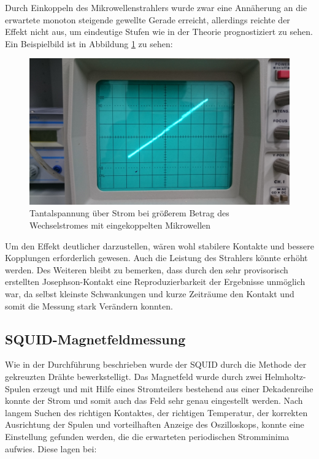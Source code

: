		Durch Einkoppeln des Mikrowellenstrahlers wurde zwar eine Annäherung an die erwartete monoton steigende gewellte Gerade erreicht, allerdings reichte der Effekt nicht aus, um eindeutige Stufen wie in der Theorie prognostiziert zu sehen. 
		Ein Beispielbild ist in Abbildung \ref{nichtwelle} zu sehen:
		\begin{figure}
			\center
			\includegraphics[scale=0.08]{messwerte/DSC_0622.JPG}
			\caption{Tantalspannung über Strom bei größerem Betrag des Wechselstromes mit eingekoppelten Mikrowellen}
			\label{nichtwelle}
		\end{figure}
		Um den Effekt deutlicher darzustellen, wären wohl stabilere Kontakte und bessere Kopplungen erforderlich gewesen. 
		Auch die Leistung des Strahlers könnte erhöht werden.
		Des Weiteren bleibt zu bemerken, dass durch den sehr provisorisch erstellten Josephson-Kontakt eine Reproduzierbarkeit der Ergebnisse unmöglich war, da selbst kleinste Schwankungen und kurze Zeiträume den Kontakt und somit die Messung stark Verändern konnten.



	\subsection{SQUID-Magnetfeldmessung} %
	\label{sub:squid_magnetfeldmessung}
	
		Wie in der Durchführung beschrieben wurde der SQUID durch die Methode der gekreuzten Drähte bewerkstelligt. 
		Das Magnetfeld wurde durch zwei Helmholtz-Spulen erzeugt und mit Hilfe eines Stromteilers bestehend aus einer Dekadenreihe konnte der Strom und somit auch das Feld sehr genau eingestellt werden.
		Nach langem Suchen des richtigen Kontaktes, der richtigen Temperatur, der korrekten Ausrichtung der Spulen und vorteilhaften Anzeige des Oszilloskops, konnte eine Einstellung gefunden werden, die die erwarteten periodischen Stromminima aufwies. 
		Diese lagen bei:

